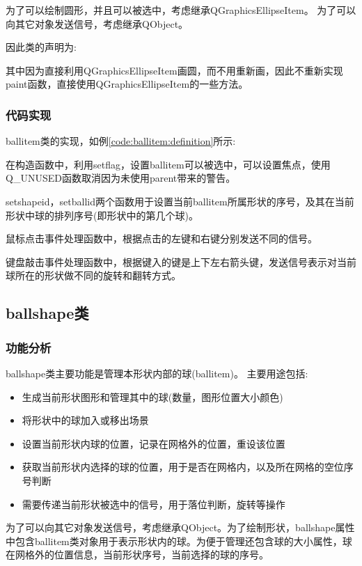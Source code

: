 \documentclass[11pt,twoside]{article} %
\begin{document}
为了可以绘制圆形，并且可以被选中，考虑继承QGraphicsEllipseItem。
为了可以向其它对象发送信号，考虑继承QObject。

因此类的声明为:

其中因为直接利用QGraphicsEllipseItem画圆，而不用重新画，因此不重新实现paint函数，直接使用QGraphicsEllipseItem的一些方法。


\subsubsection{代码实现}
ballitem类的实现，如例\ref{code:ballitem:definition}所示:

在构造函数中，利用setflag，设置ballitem可以被选中，可以设置焦点，使用Q\_UNUSED函数取消因为未使用parent带来的警告。

setshapeid，setballid两个函数用于设置当前ballitem所属形状的序号，及其在当前形状中球的排列序号(即形状中的第几个球)。

鼠标点击事件处理函数中，根据点击的左键和右键分别发送不同的信号。

键盘敲击事件处理函数中，根据键入的键是上下左右箭头键，发送信号表示对当前球所在的形状做不同的旋转和翻转方式。



\subsection{ballshape类}
\subsubsection{功能分析}
ballshape类主要功能是管理本形状内部的球(ballitem)。
主要用途包括:
\begin{itemize}
  \item 生成当前形状图形和管理其中的球(数量，图形位置大小颜色)
  \item 将形状中的球加入或移出场景
  \item 设置当前形状内球的位置，记录在网格外的位置，重设该位置
  \item 获取当前形状内选择的球的位置，用于是否在网格内，以及所在网格的空位序号判断
  \item 需要传递当前形状被选中的信号，用于落位判断，旋转等操作
\end{itemize}

为了可以向其它对象发送信号，考虑继承QObject。为了绘制形状，ballshape属性中包含ballitem类对象用于表示形状内的球。为便于管理还包含球的大小属性，球在网格外的位置信息，当前形状序号，当前选择的球的序号。
\end{document}
